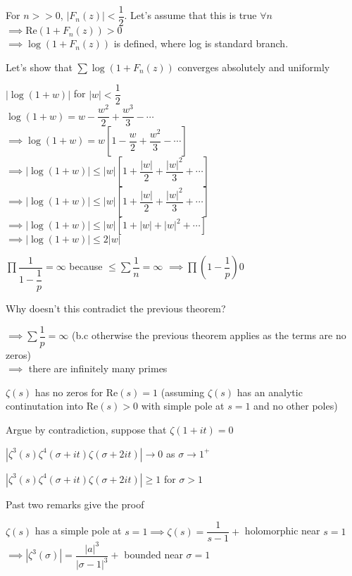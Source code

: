 \documentclass[10pt]{article}
\renewcommand{\Re}{\text{Re}}
\begin{document}
For $n >> 0$, $|F_n(z)| < \dfrac{1}{2}$.
Let's assume that this is true $\forall n$\\
$\implies \Re(1 + F_n(z)) > 0$\\
$\implies \log(1 + F_n(z))$ is defined, where log is standard branch.

Let's show that $\sum \log(1 + F_n(z))$ converges absolutely and uniformly

$| \log(1 + w)|$ for $|w| < \dfrac{1}{2}$\\
$\log(1 + w) = w - \dfrac{w^2}{2} + \dfrac{w^3}{3} - \cdots$\\
$\implies \log(1 + w) = w [1- \dfrac{w}{2} + \dfrac{w^2}{3} - \cdots ]$\\
$\implies |\log(1 + w)| \leq |w| [1+ \dfrac{|w|}{2} + \dfrac{|w|^2}{3} + \cdots ]$\\
$\implies |\log(1 + w)| \leq |w| [1+ \dfrac{|w|}{2} + \dfrac{|w|^2}{3} + \cdots ]$\\
$\implies |\log(1 + w)| \leq |w| [1+ |w| + |w|^2 + \cdots ]$\\ 
$\implies |\log(1 + w)| \leq 2|w|$

$\prod \dfrac{1}{1-\dfrac{1}{p}} = \infty$ because $ \leq \sum \dfrac{1}{n} = \infty$
$\implies \prod (1 - \dfrac{1}{p}) 0$

Why doesn't this contradict the previous theorem?

$\implies \sum \dfrac{1}{p} = \infty$ (b.c otherwise the previous theorem applies as the terms are no zeros)\\
$\implies$ there are infinitely many primes

\begin{thm}
   $\zeta(s)$ has no zeros for $\Re(s) = 1$ (assuming $\zeta(s)$ has an analytic continutation into $\Re(s) > 0$ with simple pole at $s = 1$ and no other poles)
\end{thm}

Argue by contradiction, suppose that $\zeta(1 + it) = 0$

\begin{rmk}
   $|\zeta^3(s)\zeta^4(\sigma + it)\zeta(\sigma + 2it)| \to 0$ as $\sigma \to 1^+$
\end{rmk}

\begin{rmk}
   $|\zeta^3(s)\zeta^4(\sigma + it)\zeta(\sigma + 2it)| \geq 1$ for $\sigma > 1$
\end{rmk}

Past two remarks give the proof

\begin{rmk}
   $\zeta(s)$ has a simple pole at $s = 1 \implies \zeta(s) = \dfrac{1}{s-1} +$ holomorphic near $s = 1$\\
   $\implies |\zeta^3(\sigma)| = \dfrac{|a|^3}{|\sigma -1|^3} +$ bounded near $\sigma = 1$
\end{rmk}
\end{document}
